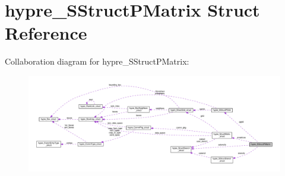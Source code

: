 \hypertarget{structhypre__SStructPMatrix}{}\section{hypre\+\_\+\+S\+Struct\+P\+Matrix Struct Reference}
\label{structhypre__SStructPMatrix}


Collaboration diagram for hypre\+\_\+\+S\+Struct\+P\+Matrix\+:
\nopagebreak
\begin{figure}[H]
\begin{center}
\leavevmode
\includegraphics[width=350pt]{structhypre__SStructPMatrix__coll__graph}
\end{center}
\end{figure}
